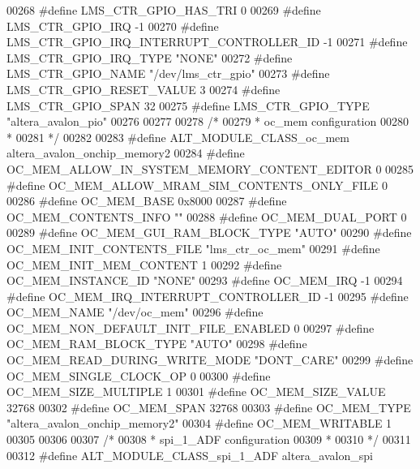 \begin{DoxyCode}
00268 \textcolor{preprocessor}{#define LMS\_CTR\_GPIO\_HAS\_TRI 0}
00269 \textcolor{preprocessor}{#define LMS\_CTR\_GPIO\_IRQ -1}
00270 \textcolor{preprocessor}{#define LMS\_CTR\_GPIO\_IRQ\_INTERRUPT\_CONTROLLER\_ID -1}
00271 \textcolor{preprocessor}{#define LMS\_CTR\_GPIO\_IRQ\_TYPE "NONE"}
00272 \textcolor{preprocessor}{#define LMS\_CTR\_GPIO\_NAME "/dev/lms\_ctr\_gpio"}
00273 \textcolor{preprocessor}{#define LMS\_CTR\_GPIO\_RESET\_VALUE 3}
00274 \textcolor{preprocessor}{#define LMS\_CTR\_GPIO\_SPAN 32}
00275 \textcolor{preprocessor}{#define LMS\_CTR\_GPIO\_TYPE "altera\_avalon\_pio"}
00276 
00277 
00278 \textcolor{comment}{/*}
00279 \textcolor{comment}{ * oc\_mem configuration}
00280 \textcolor{comment}{ *}
00281 \textcolor{comment}{ */}
00282 
00283 \textcolor{preprocessor}{#define ALT\_MODULE\_CLASS\_oc\_mem altera\_avalon\_onchip\_memory2}
00284 \textcolor{preprocessor}{#define OC\_MEM\_ALLOW\_IN\_SYSTEM\_MEMORY\_CONTENT\_EDITOR 0}
00285 \textcolor{preprocessor}{#define OC\_MEM\_ALLOW\_MRAM\_SIM\_CONTENTS\_ONLY\_FILE 0}
00286 \textcolor{preprocessor}{#define OC\_MEM\_BASE 0x8000}
00287 \textcolor{preprocessor}{#define OC\_MEM\_CONTENTS\_INFO ""}
00288 \textcolor{preprocessor}{#define OC\_MEM\_DUAL\_PORT 0}
00289 \textcolor{preprocessor}{#define OC\_MEM\_GUI\_RAM\_BLOCK\_TYPE "AUTO"}
00290 \textcolor{preprocessor}{#define OC\_MEM\_INIT\_CONTENTS\_FILE "lms\_ctr\_oc\_mem"}
00291 \textcolor{preprocessor}{#define OC\_MEM\_INIT\_MEM\_CONTENT 1}
00292 \textcolor{preprocessor}{#define OC\_MEM\_INSTANCE\_ID "NONE"}
00293 \textcolor{preprocessor}{#define OC\_MEM\_IRQ -1}
00294 \textcolor{preprocessor}{#define OC\_MEM\_IRQ\_INTERRUPT\_CONTROLLER\_ID -1}
00295 \textcolor{preprocessor}{#define OC\_MEM\_NAME "/dev/oc\_mem"}
00296 \textcolor{preprocessor}{#define OC\_MEM\_NON\_DEFAULT\_INIT\_FILE\_ENABLED 0}
00297 \textcolor{preprocessor}{#define OC\_MEM\_RAM\_BLOCK\_TYPE "AUTO"}
00298 \textcolor{preprocessor}{#define OC\_MEM\_READ\_DURING\_WRITE\_MODE "DONT\_CARE"}
00299 \textcolor{preprocessor}{#define OC\_MEM\_SINGLE\_CLOCK\_OP 0}
00300 \textcolor{preprocessor}{#define OC\_MEM\_SIZE\_MULTIPLE 1}
00301 \textcolor{preprocessor}{#define OC\_MEM\_SIZE\_VALUE 32768}
00302 \textcolor{preprocessor}{#define OC\_MEM\_SPAN 32768}
00303 \textcolor{preprocessor}{#define OC\_MEM\_TYPE "altera\_avalon\_onchip\_memory2"}
00304 \textcolor{preprocessor}{#define OC\_MEM\_WRITABLE 1}
00305 
00306 
00307 \textcolor{comment}{/*}
00308 \textcolor{comment}{ * spi\_1\_ADF configuration}
00309 \textcolor{comment}{ *}
00310 \textcolor{comment}{ */}
00311 
00312 \textcolor{preprocessor}{#define ALT\_MODULE\_CLASS\_spi\_1\_ADF altera\_avalon\_spi}

\end{DoxyCode}
